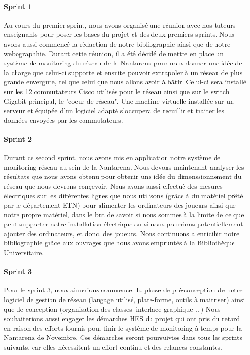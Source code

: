 \documentclass[french]{article}
\begin{document}
\paragraph{Sprint 1}
Au cours du premier sprint, nous avons organisé une réunion avec nos tuteurs enseignants pour poser les bases du projet et des deux premiers sprints. Nous avons aussi commencé la rédaction de notre bibliographie ainsi que de notre webographhie.
Durant cette réunion, il a été décidé de mettre en place un système de monitoring du réseau de la Nantarena pour nous donner une idée de la charge que celui-ci supporte et ensuite pouvoir extrapoler à un réseau de plus grande envergure, tel que celui que nous allons avoir à bâtir.
Celui-ci sera installé sur les 12 commutateurs Cisco utilisés pour le réseau ainsi que sur le switch Gigabit principal, le "coeur de réseau".
Une machine virtuelle installée sur un serveur et équipée d'un logiciel adapté s'occupera de recuillir et traiter les données envoyées par les commutateurs.

\paragraph{Sprint 2}
Durant ce second sprint, nous avons mis en application notre système de monitoring réseau au sein de la Nantarena. Nous devons maintenant analyser les résultats que nous avons obtenu pour obtenir une idée du dimenssionnement du réseau que nous devrons conçevoir. Nous avons aussi effectué des mesures électriques sur les différentes lignes que nous utilisons (grâce à du matériel prêté par le département ETN) pour alimenter les ordinateurs des joueurs ainsi que notre propre matériel, dans le but de savoir si nous sommes à la limite de ce que peut supporter notre installation électrique ou si nous pourrions potentiellement ajouter des ordinateurs, et donc, des joueurs.
Nous continuons a enricihir notre bibliographie grâce aux ouvrages que nous avons empruntés à la Bibliothèque Universitaire.

\paragraph{Sprint 3}
Pour le sprint 3, nous aimerions commencer la phase de pré-conception de notre logiciel de gestion de réseau (langage utilisé, plate-forme, outils à maitriser) ainsi que de conception (organisation des classes, interface graphique ...)
Nous souhaiterions aussi engager les démarches HES du projet qui ont pris du retard en raison des efforts fournis pour finir le système de monitoring à temps pour la Nantarena de Novembre. Ces démarches seront poursuivies dans tous les sprints suivants, car elles nécessitent un effort continu et des relances constantes.
\end{document}

